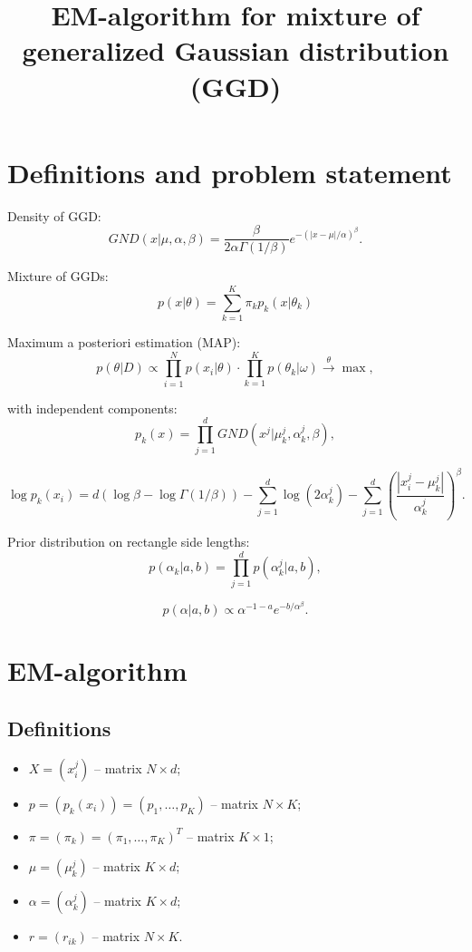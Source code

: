 \documentclass[12pt]{article}
\title{EM-algorithm for mixture of generalized Gaussian distribution (GGD)}
\author{}
\date{}
\theoremstyle{definition}
\theoremstyle{plain}
\begin{document}
\maketitle
\thispagestyle{empty}

\section{Definitions and problem statement}
Density of GGD:
$$
GND(x | \mu, \alpha, \beta) = \frac{\beta}{2 \alpha \Gamma(1/\beta)} 
e^{-(|x - \mu|/\alpha)^{\beta}}.
$$

Mixture of GGDs:
$$
p(x | \theta) = \sum_{k = 1}^{K} \pi_k p_k(x | \theta_k)
$$

Maximum a posteriori estimation (MAP):
$$
p(\theta | D) \propto 
\prod_{i = 1}^N p(x_i | \theta) \cdot 
\prod_{k = 1}^K p(\theta_k | \omega) \xrightarrow{\theta} \max,
$$

with independent components:
$$
p_k(x) = \prod_{j = 1}^{d} GND(x^j | \mu^j_k, \alpha^j_k, \beta),
$$

$$
\log p_k(x_i) = d \left( \log \beta - \log \Gamma(1 / \beta)\right) - 
\sum_{j=1}^d \log (2 \alpha_k^j) - 
\sum_{j=1}^d \left( \frac{|x_i^j - \mu_k^j|}{\alpha_k^j} \right)^\beta .
$$

Prior distribution on rectangle side lengths:
$$
p(\alpha_k | a, b) = \prod_{j = 1}^d p(\alpha^j_k | a, b),
$$

$$
p(\alpha | a, b) \propto \alpha^{-1 - a} e^{-b / \alpha^\beta}.
$$

\section{EM-algorithm}

\subsection{Definitions}
\begin{itemize}
\item $X = (x_i^j)$ -- matrix $N \times d$;
\item $p = (p_k(x_i)) = (p_1, \ldots, p_K)$ -- matrix $N \times K$;
\item $\pi = (\pi_k) = (\pi_1, \ldots, \pi_K)^T$ -- matrix $K \times 1$;
\item $\mu = (\mu_k^j)$ -- matrix $K \times d$;
\item $\alpha = (\alpha_k^j)$ -- matrix $K \times d$;
\item $r = (r_{ik})$ -- matrix $N \times K$.
\end{itemize}
\end{document}
